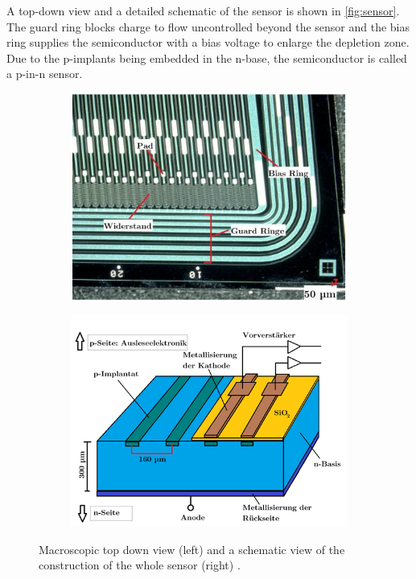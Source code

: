 A top-down view and a detailed schematic of the sensor is shown in \autoref{fig:sensor}. The guard ring blocks charge to flow uncontrolled beyond the sensor
and the bias ring supplies the semiconductor with a bias voltage to enlarge the depletion zone. Due to the p-implants
being embedded in the n-base, the semiconductor is called a p-in-n sensor.
\begin{figure}
    \centering
    \begin{subfigure}{0.45\textwidth}
      \includegraphics[width = \textwidth]{content/pics/Silicon_Sensor_TOPDOWN.png}
    \end{subfigure}
    \hfill
    \begin{subfigure}{0.45\textwidth}
      \includegraphics[width = \textwidth]{content/pics/Silicon_Sensor_SCHEMATIC.png}
    \end{subfigure}    
    \caption{Macroscopic top down view (left) and a schematic view of the construction of the whole sensor (right) \cite{SiliconStrip}.}
    \label{fig:sensor}
  \end{figure}\\
